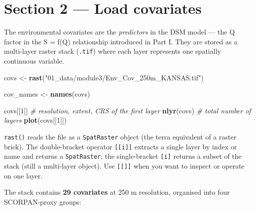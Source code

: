 \documentclass[
  10pt,
  b5paper,
  oneside]{book}
\newenvironment{Shaded}{\begin{snugshade}}{\end{snugshade}}
\newcommand{\CommentTok}[1]{\textcolor[rgb]{0.56,0.35,0.01}{\textit{#1}}}
\newcommand{\DecValTok}[1]{\textcolor[rgb]{0.00,0.00,0.81}{#1}}
\newcommand{\FunctionTok}[1]{\textcolor[rgb]{0.13,0.29,0.53}{\textbf{#1}}}
\newcommand{\NormalTok}[1]{#1}
\newcommand{\OtherTok}[1]{\textcolor[rgb]{0.56,0.35,0.01}{#1}}
\newcommand{\StringTok}[1]{\textcolor[rgb]{0.31,0.60,0.02}{#1}}
\begin{document}
\section*{Section 2 --- Load covariates}\label{section-2-load-covariates}

The environmental covariates are the \emph{predictors} in the DSM model --- the Q factor in
the S = f(Q) relationship introduced in Part I. They are stored as a multi-layer raster
stack (\texttt{.tif}) where each layer represents one spatially continuous variable.

\begin{Shaded}
\begin{Highlighting}[]
\NormalTok{covs }\OtherTok{\textless{}{-}} \FunctionTok{rast}\NormalTok{(}\StringTok{"01\_data/module3/Env\_Cov\_250m\_KANSAS.tif"}\NormalTok{)}

\NormalTok{cov\_names }\OtherTok{\textless{}{-}} \FunctionTok{names}\NormalTok{(covs)}

\NormalTok{covs[[}\DecValTok{1}\NormalTok{]]   }\CommentTok{\# resolution, extent, CRS of the first layer}
\FunctionTok{nlyr}\NormalTok{(covs)  }\CommentTok{\# total number of layers}
\FunctionTok{plot}\NormalTok{(covs[[}\DecValTok{1}\NormalTok{]])}
\end{Highlighting}
\end{Shaded}

\texttt{rast()} reads the file as a \texttt{SpatRaster} object (the terra equivalent of a raster
brick). The double-bracket operator \texttt{{[}{[}i{]}{]}} extracts a single layer by index or name
and returns a \texttt{SpatRaster}; the single-bracket \texttt{{[}i{]}} returns a subset of the stack
(still a multi-layer object). Use \texttt{{[}{[}{]}{]}} when you want to inspect or operate on one
layer.

The stack contains \textbf{29 covariates} at 250 m resolution, organised into four
SCORPAN-proxy groups:
\end{document}
